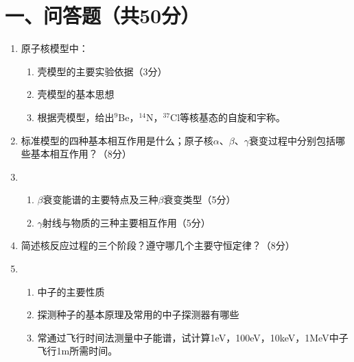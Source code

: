 \documentclass{article}
\begin{document}
\section*{一、问答题（共50分）}
\begin{enumerate}
  \item 原子核模型中：
  \begin{enumerate}
    \item 壳模型的主要实验依据（3分）
    \item 壳模型的基本思想
    \item 根据壳模型，给出$^{9}$Be，$^{14}$N，$^{37}$Cl等核基态的自旋和宇称。
  \end{enumerate}

  \item 标准模型的四种基本相互作用是什么；原子核$\alpha$、$\beta$、$\gamma$衰变过程中分别包括哪些基本相互作用？（8分）

\item 
  \begin{enumerate}
    \item $\beta$衰变能谱的主要特点及三种$\beta$衰变类型（5分）
    \item $\gamma$射线与物质的三种主要相互作用（5分）
  \end{enumerate}

  \item 简述核反应过程的三个阶段？遵守哪几个主要守恒定律？（8分）

   \item 
  \begin{enumerate}
    \item 中子的主要性质
    \item 探测种子的基本原理及常用的中子探测器有哪些
    \item 常通过飞行时间法测量中子能谱，试计算1eV，100eV，10keV，1MeV中子飞行1m所需时间。
  \end{enumerate}
\end{enumerate}
\end{document}

